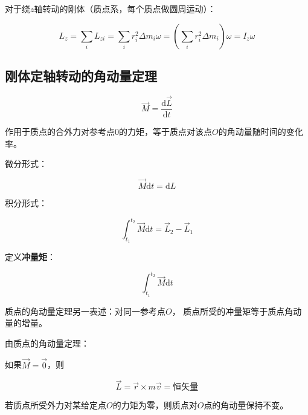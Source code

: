 \documentclass[
	12pt, %
	a4paper, %
]{myLegrandOrangeBook}
\newcommand{\rmd}{\mathrm{d}}
\newcommand{\deriv}[2]{\frac{\rmd #1}{\rmd #2}}
\begin{document}
\begin{definition}[刚体的角动量]

    对于绕\(z\)轴转动的刚体（质点系，每个质点做圆周运动）：

    \begin{equation}
        L_z =\sum_i L_{z i}=\sum_i r_i^2 \Delta m_i \omega
        =\left(\sum_i r_i^2 \Delta m_i\right) \omega=I_z \omega
    \end{equation}
\end{definition}

\subsection{刚体定轴转动的角动量定理}

\begin{theorem}[质点的角动量定理]
    \begin{equation}
        \overrightarrow{M} = \deriv{\overrightarrow{L}}{t}
    \end{equation}

    作用于质点的合外力对参考点0的力矩，等于质点对该点\(O\)的角动量随时间的变化率。

    微分形式：

    \begin{equation}
        \overrightarrow{M} \rmd t = \rmd L
    \end{equation}

    积分形式：

    \begin{equation}
        \int_{t_1}^{t_2} \overrightarrow{M} \rmd t = \overrightarrow{L}_2 - \overrightarrow{L}_1
    \end{equation}
\end{theorem}

    定义\textbf{冲量矩}：

    \begin{equation}
        \int_{t_1}^{t_2} \overrightarrow{M} \rmd t
    \end{equation}

    质点的角动量定理另一表述：对同一参考点\(O\)，
    质点所受的冲量矩等于质点角动量的增量。

\begin{theorem}[质点的角动量守恒定律]

    由质点的角动量定理：

    如果\(\overrightarrow{M}=\overrightarrow{0}\)，则

    \begin{equation}
        \overrightarrow{L} = \overrightarrow{r} \times m \overrightarrow{v}
        = \text{恒矢量}
    \end{equation}

    若质点所受外力对某给定点\(O\)的力矩为零，则质点对\(O\)点的角动量保持不变。
\end{theorem}
\end{document}
